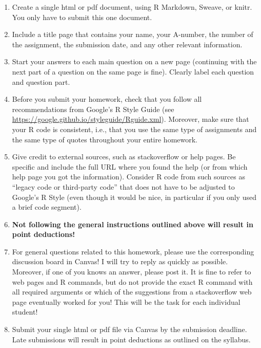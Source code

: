 \documentclass[12pt,letterpaper,final]{article}
\begin{document}
\begin{enumerate}
\item Create a single html or pdf document, using R Markdown, Sweave, or knitr.
You only have to submit this one document.

\item Include a title page that contains your name, your A-number, the number of
the assignment, the submission date, and any other relevant information.

\item Start your answers to each main question on a new page (continuing with the next
part of a question on the same page is fine). 
Clearly label each question and question part.

\item Before you submit your homework, check that you
follow all recommendations from Google's R Style Guide
(see \url{https://google.github.io/styleguide/Rguide.xml}). 
Moreover, make sure that your R code is consistent, i.e., that you use the same
type of assignments and the same type of quotes throughout your entire homework.

\item Give credit to external sources, such as stackoverflow or help pages. Be specific
and include the full URL where you found the help (or from which help page you got 
the information). Consider R code from such sources as ``legacy code or third-party code'' 
that does not have to be adjusted to Google's R Style (even though it would be nice,
in particular if you only used a brief code segment).

\item {\bf Not following the general instructions outlined above will result in point deductions!}

\item For general questions related to this homework, please
use the corresponding discussion board in Canvas! I will try to
reply as quickly as possible. Moreover, if one of you knows
an answer, please post it. It is fine to refer to web pages
and R commands, but do not provide the exact R command with all required arguments
or which of the suggestions from a stackoverflow web page eventually worked for you! 
This will be the task for each individual student!

\item Submit your single html or pdf file via Canvas by the submission deadline.
Late submissions will result in point deductions as outlined on the syllabus.

\end{enumerate}
\end{document}
